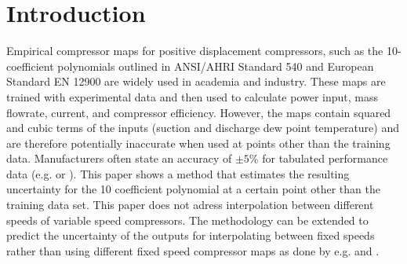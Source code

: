 \section{Introduction}
\label{sec:introduction}
Empirical compressor maps for positive displacement compressors, such as the 10-coefficient polynomials outlined in ANSI/AHRI Standard 540 \cite{AHRI:540} and European Standard EN 12900 \cite{CEN:2013}  are widely used in academia and industry.  These maps are trained with experimental data and then used to calculate power input, mass flowrate, current, and compressor efficiency.  However, the maps contain squared and cubic terms of the inputs (suction and discharge dew point temperature) and are therefore potentially inaccurate when used at points other than the training data. Manufacturers often state an accuracy of $\pm 5 \%$ for tabulated performance data (e.g. \cite{emerson:2006} or \cite{bristol:2015}).
This paper shows a method that estimates the resulting uncertainty for the 10 coefficient polynomial at a certain point other than the training data set. This paper does not adress interpolation between different speeds of variable speed compressors. The methodology can be extended to predict the uncertainty of the outputs for interpolating between fixed speeds rather than using different fixed speed compressor maps as done by e.g.  \cite{shen:2014} and \cite{caskey:2012}.